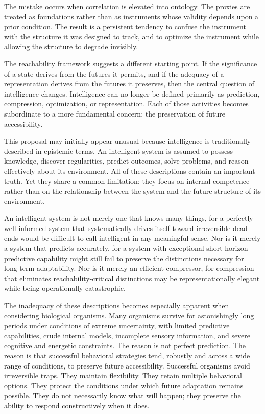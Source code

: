 \documentclass[12pt,a4paper]{article}
\theoremstyle{plain}
\theoremstyle{definition}
\theoremstyle{remark}
\begin{document}
The mistake occurs when correlation is elevated into ontology. The proxies
are treated as foundations rather than as instruments whose validity depends
upon a prior condition. The result is a persistent tendency to confuse the
instrument with the structure it was designed to track, and to optimize the
instrument while allowing the structure to degrade invisibly.

The reachability framework suggests a different starting point. If the
significance of a state derives from the futures it permits, and if the
adequacy of a representation derives from the futures it preserves, then the
central question of intelligence changes. Intelligence can no longer be
defined primarily as prediction, compression, optimization, or
representation. Each of those activities becomes subordinate to a more
fundamental concern: the preservation of future accessibility.

This proposal may initially appear unusual because intelligence is
traditionally described in epistemic terms. An intelligent system is assumed
to possess knowledge, discover regularities, predict outcomes, solve
problems, and reason effectively about its environment. All of these
descriptions contain an important truth. Yet they share a common limitation:
they focus on internal competence rather than on the relationship between
the system and the future structure of its environment.

An intelligent system is not merely one that knows many things, for a
perfectly well-informed system that systematically drives itself toward
irreversible dead ends would be difficult to call intelligent in any
meaningful sense. Nor is it merely a system that predicts accurately, for
a system with exceptional short-horizon predictive capability might still
fail to preserve the distinctions necessary for long-term adaptability.
Nor is it merely an efficient compressor, for compression that eliminates
reachability-critical distinctions may be representationally elegant while
being operationally catastrophic.

The inadequacy of these descriptions becomes especially apparent when
considering biological organisms. Many organisms survive for astonishingly
long periods under conditions of extreme uncertainty, with limited predictive
capabilities, crude internal models, incomplete sensory information, and
severe cognitive and energetic constraints. The reason is not perfect
prediction. The reason is that successful behavioral strategies tend,
robustly and across a wide range of conditions, to preserve future
accessibility. Successful organisms avoid irreversible traps. They maintain
flexibility. They retain multiple behavioral options. They protect the
conditions under which future adaptation remains possible. They do not
necessarily know what will happen; they preserve the ability to respond
constructively when it does.
\end{document}
